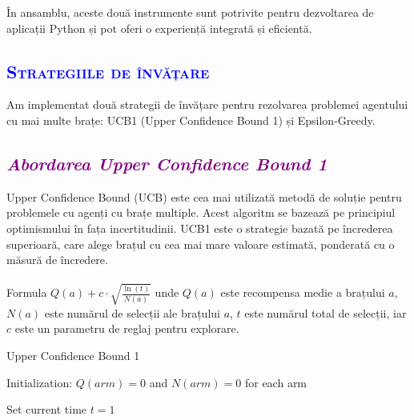\documentclass{article}
\begin{document}
În ansamblu, aceste două instrumente sunt potrivite pentru dezvoltarea de aplicații Python și pot oferi o experiență integrată și eficientă.
	\begin{center}
	    \textcolor{blue}{\section{\bfseries\scshape\textcolor{blue}{Strategiile de învățare}}}
	\end{center}
Am implementat două strategii de învățare pentru rezolvarea problemei agentului cu mai multe brațe: UCB1 (Upper Confidence Bound 1) și Epsilon-Greedy.
\vspace{5mm}
\textcolor{purple}{\subsection{\itshape \textcolor{purple}{Abordarea Upper Confidence Bound 1}}}
Upper Confidence Bound (UCB) este cea mai utilizată metodă de soluție pentru problemele cu agenți cu brațe multiple. Acest algoritm se bazează pe principiul optimismului în fața incertitudinii. UCB1 este o strategie bazată pe încrederea superioară, care alege brațul cu cea mai mare valoare estimată, ponderată cu o măsură de încredere.\\\\
Formula $Q(a) + c \cdot \sqrt{\frac{\ln(t)}{N(a)}}$ unde  $Q(a)$ este recompensa medie a brațului $a$, $N(a)$ este numărul de selecții ale brațului $a$, $t$ este numărul total de selecții, iar $c$ este un parametru de reglaj pentru explorare.
\vspace{5mm}
\begin{algorithm}
\caption{Upper Confidence Bound 1}
Initialization: $Q(arm) = 0$ and $N(arm) = 0$ for each arm\;

Set current time $t = 1$\;\\

\end{algorithm}
\end{document}

